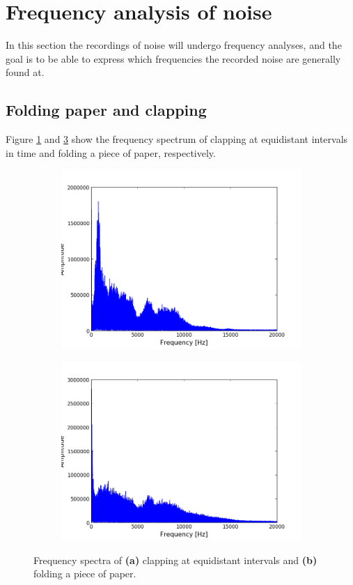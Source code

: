 \section{Frequency analysis of noise}
In this section the recordings of noise will undergo frequency analyses, and the goal is to be able to express which frequencies the recorded noise are generally found at.
\subsection{Folding paper and clapping}
Figure \ref{fig:clapping} and \ref{fig:folding} show the frequency spectrum of clapping at equidistant intervals in time and folding a piece of paper, respectively.
\begin{figure}[H]
\centering
\begin{subfigure}{0.49\textwidth}
\centering
\includegraphics[width=\textwidth]{figures/freqanal/clapping.png}
\caption{}
\label{fig:clapping}
\end{subfigure}
\begin{subfigure}{0.49\textwidth}
\centering
\includegraphics[width=\textwidth]{figures/freqanal/folding.png}
\caption{}
\label{fig:folding}
\end{subfigure}
\caption{Frequency spectra of \textbf{(a)} clapping at equidistant intervals and \textbf{(b)} folding a piece of paper.}
\end{figure}
